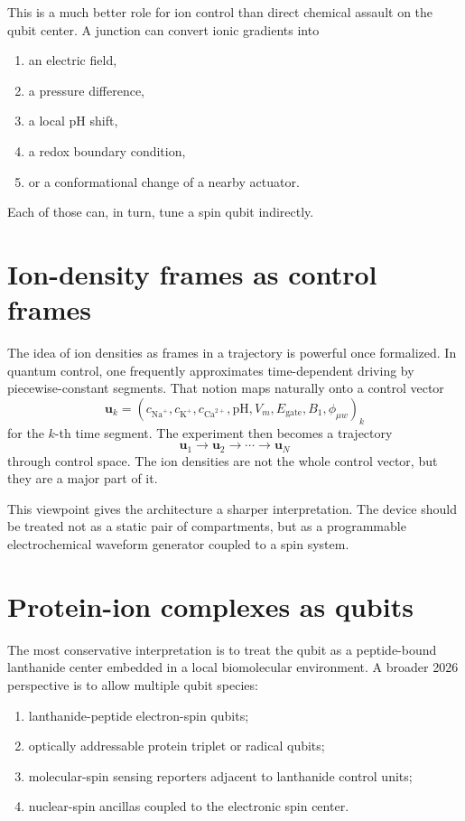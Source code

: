 \documentclass[11pt]{report}
\theoremstyle{definition}
\begin{document}
This is a much better role for ion control than direct chemical assault on the qubit center. A junction can convert ionic gradients into

\begin{enumerate}[leftmargin=2em]
\item an electric field,
\item a pressure difference,
\item a local pH shift,
\item a redox boundary condition,
\item or a conformational change of a nearby actuator.
\end{enumerate}

Each of those can, in turn, tune a spin qubit indirectly.

\section{Ion-density frames as control frames}
The idea of ion densities as frames in a trajectory is powerful once formalized. In quantum control, one frequently approximates time-dependent driving by piecewise-constant segments. That notion maps naturally onto a control vector
\[
\mathbf{u}_k =
\left(
c_{\mathrm{Na}^+},
c_{\mathrm{K}^+},
c_{\mathrm{Ca}^{2+}},
\mathrm{pH},
V_m,
E_{\mathrm{gate}},
B_1,
\phi_{\mu w}
\right)_k
\]
for the $k$-th time segment. The experiment then becomes a trajectory
\[
\mathbf{u}_1 \rightarrow \mathbf{u}_2 \rightarrow \cdots \rightarrow \mathbf{u}_N
\]
through control space. The ion densities are not the whole control vector, but they are a major part of it.

This viewpoint gives the architecture a sharper interpretation. The device should be treated not as a static pair of compartments, but as a programmable electrochemical waveform generator coupled to a spin system.

\section{Protein-ion complexes as qubits}
The most conservative interpretation is to treat the qubit as a peptide-bound lanthanide center embedded in a local biomolecular environment. A broader 2026 perspective is to allow multiple qubit species:

\begin{enumerate}[leftmargin=2em]
\item lanthanide-peptide electron-spin qubits;
\item optically addressable protein triplet or radical qubits;
\item molecular-spin sensing reporters adjacent to lanthanide control units;
\item nuclear-spin ancillas coupled to the electronic spin center.
\end{enumerate}
\end{document}
